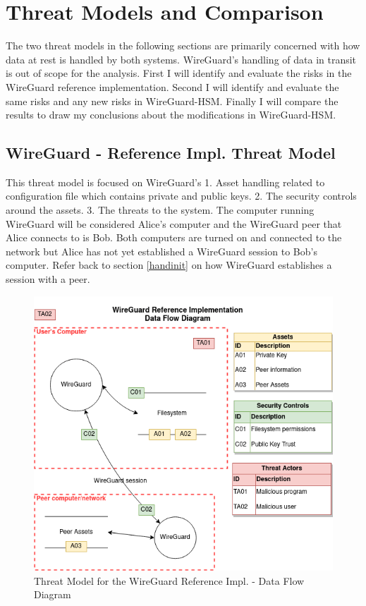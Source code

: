 \documentclass [11pt, proquest] {uwthesis}[2020/02/24]
\begin{document}
\chapter {Threat Models and Comparison}
The two threat models in the following sections are primarily concerned with how data at rest is handled by both systems. WireGuard's handling of data in transit is out of scope for the analysis.
First I will identify and evaluate the risks in the WireGuard reference implementation. Second I will identify and evaluate the same risks and any new risks in WireGuard-HSM. Finally I will compare the results to draw my conclusions about the modifications in WireGuard-HSM.

\section {WireGuard - Reference Impl. Threat Model}
\label{wg-ref-analysis}
This threat model is focused on WireGuard's 1. Asset handling related to configuration file which contains private and public keys. 2. The security controls around the assets. 3. The threats to the system. 
The computer running WireGuard will be considered Alice's computer and the WireGuard peer that Alice connects to is Bob. Both computers are turned on and connected to the network but Alice has not yet established a WireGuard session to Bob's computer. Refer back to section \ref{handinit} on how WireGuard establishes a session with a peer. 

\begin{figure}[ht]
\centering
\includegraphics[width=14cm]{paper/images/WGH_DFD.png}
\caption{Threat Model for the WireGuard Reference Impl. - Data Flow Diagram}
\label{fig:wg_ref_dfd}
\end{figure}
\end{document}
